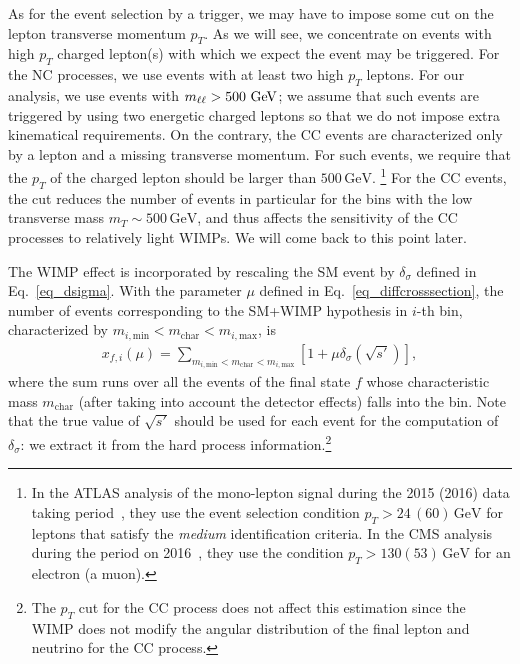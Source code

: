 \documentclass[12pt,twoside,book]{article}
\begin{document}
As for the event selection by a trigger, we may have to impose some cut on the lepton transverse momentum $p_T$.
As we will see, we concentrate on events with high $p_T$ charged lepton(s) with which we expect the event may be triggered.
For the NC processes, we use events with at least two high $p_T$ leptons.  For our analysis, we use events with $m_{\ell\ell}>500\ {\rm GeV}$; we assume that such events are triggered by using two energetic charged leptons so that we do not impose extra kinematical requirements.
On the contrary, the CC events are characterized only by a lepton and a missing transverse momentum.
For such events, we require that the $p_T$ of the charged lepton should be larger than $500\,\mathrm{GeV}$.
\footnote{
  In the ATLAS analysis of the mono-lepton signal during the 2015 (2016) data taking period~\cite{Aaboud:2017efa}, they use the event selection condition $p_T > 24\, (60)\,\mathrm{GeV}$ for leptons that satisfy the \textit{medium} identification criteria.
  In the CMS analysis during the period on 2016~\cite{Sirunyan:2018mpc}, they use the condition $p_T > 130 (53)\, \mathrm{GeV}$ for an electron (a muon).
}
For the CC events, the cut reduces the number of events in particular for the bins with the low transverse mass $m_T \sim 500\, \mathrm{GeV}$, and thus affects the sensitivity of the CC processes to relatively light WIMPs.
We will come back to this point later.


The WIMP effect is incorporated by rescaling the SM event by $\delta_\sigma$ defined in Eq.~\eqref{eq_dsigma}.
With the parameter $\mu$ defined in Eq.~\eqref{eq_diffcrosssection}, the number of events corresponding to the SM+WIMP hypothesis in $i$-th bin, characterized by $m_{i, \mathrm{min}} < m_{\mathrm{char}} < m_{i, \mathrm{max}}$, is
\begin{align}
  x_{f,i} (\mu) = \sum_{m_{i, \mathrm{min}} < m_{\mathrm{char}} < m_{i, \mathrm{max}}}
  \left[
    1 + \mu \delta_\sigma (\sqrt{s'})
  \right],
  \label{eq_n_tot}
\end{align}
where the sum runs over all the events of the final state $f$ whose characteristic mass $m_{\mathrm{char}}$ (after taking into account the detector effects) falls into the bin.
Note that the true value of $\sqrt{s'}$ should be used for each event for the computation of $\delta_\sigma$: we extract it from the hard process information.\footnote
{
	The $p_T$ cut for the CC process does not affect this estimation since the WIMP does not modify the angular distribution of the final lepton and neutrino for the CC process.
}
\end{document}
